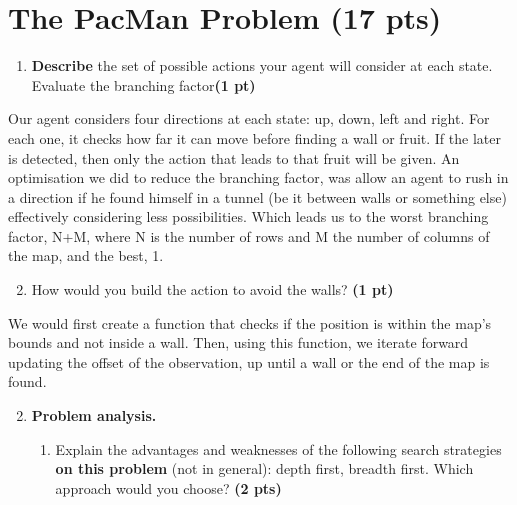 \documentclass[11pt,a4paper]{../template/report}
\begin{document}
\section{The 
PacMan Problem (17 pts)}

\begin{enumerate}
\setcounter{enumi}{1}
\begin{enumerate}
\item \textbf{Describe} the set of possible actions your agent will consider at each state. Evaluate the branching factor\textbf{(1 pt)}
\end{enumerate}
  
\end{enumerate}

\begin{answer}
Our agent considers four directions at each state: up, down, left and right. For each one, it checks
how far it can move before finding a wall or fruit. If the later is detected, then only the action that leads to that fruit will be given.
An optimisation we did to reduce the branching factor, was allow an agent to rush in a direction if he found himself in a tunnel (be it between walls or something else) effectively considering less possibilities.
Which leads us to the worst branching factor, N+M, where N is the number of rows and M the number of columns of the map, and the best, 1.
\end{answer}
\begin{enumerate}
\setcounter{enumi}{1}
\begin{enumerate}
\setcounter{enumii}{1}
    \item  How would you build the action to avoid the walls? \textbf{(1 pt)}
\end{enumerate}
  
\end{enumerate}

\begin{answer}
We would first create a function that checks if the position is within the map's bounds and not inside a wall. Then, using this function, we iterate forward
updating the offset of the observation, up until a wall or the end of the map is found. 
\end{answer}



\begin{enumerate}
\setcounter{enumi}{1}
    \item \textbf{Problem analysis.}
    \begin{enumerate}
        \item Explain the advantages and weaknesses of the following search strategies \textbf{on this problem} (not in general): depth first, breadth first. Which approach would you choose? \textbf{(2 pts)}
    \end{enumerate}
\end{enumerate}
\end{document}
